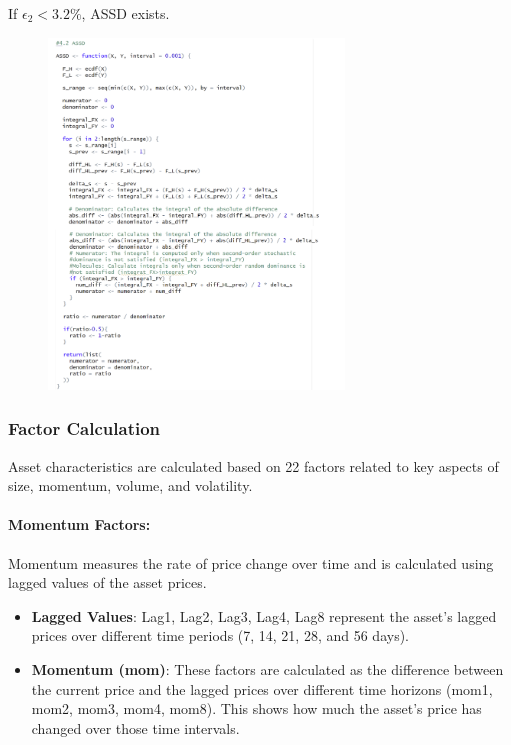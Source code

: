 \documentclass{article}
\begin{document}
If $\epsilon_2 < 3.2\%$, ASSD exists.
\begin{figure}[H]
    \centering
    \includegraphics[width=0.7\textwidth]{12.png}
    \label{fig:example}
\end{figure}
\hypertarget{Factor Calculation}{%
\subsubsection{Factor Calculation}\label{Factor Calculation}}


Asset characteristics are calculated based on 22 factors related to key aspects of size, momentum, volume, and volatility.

\paragraph{Momentum Factors:}
Momentum measures the rate of price change over time and is calculated using lagged values of the asset prices. 
\begin{itemize}
    \item \textbf{Lagged Values}: Lag1, Lag2, Lag3, Lag4, Lag8 represent the asset’s lagged prices over different time periods (7, 14, 21, 28, and 56 days). 
    \item \textbf{Momentum (mom)}: These factors are calculated as the difference between the current price and the lagged prices over different time horizons (mom1, mom2, mom3, mom4, mom8). This shows how much the asset’s price has changed over those time intervals. 
\end{itemize}
\end{document}
